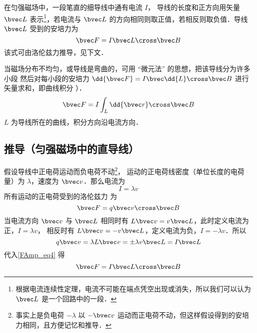 

在匀强磁场中，一段笔直的细导线中通有电流 $I$， 导线的长度和正方向用矢量 $\bvec L$ 表示\footnote{根据电流连续性定理，电流不可能在端点凭空出现或消失，所以我们可以认为 $\bvec L$ 是一个回路中的一段．}，若电流与 $\bvec L$ 的方向相同则取正值，若相反则取负值．导线 $\bvec L$ 受到的安培力为
\begin{equation}
\bvec F = I \bvec L \cross \bvec B
\end{equation}
该式可由洛伦兹力推导，见下文．

当磁场分布不均匀，或导线是弯曲的，可用 “微元法” 的思想，把该导线分为许多小段
然后对每小段的安培力 $\dd{\bvec F} = I\bvec \dd{L} \cross\bvec B$ 进行矢量求和，即曲线积分%
）．
\begin{equation}
\bvec F = I\int_L \dd{\bvec r} \cross \bvec B
\end{equation}
$L$ 为导线所在的曲线，积分方向沿电流方向．

\subsection{推导（匀强磁场中的直导线）}
假设导线中正电荷运动而负电荷不动\footnote{事实上是负电荷 $-\lambda$ 以 $-\bvec v$ 运动而正电荷不动，但这样假设得到的安培力相同，且方便记忆和推导．}， 运动的正电荷线密度（单位长度的电荷量）为 $\lambda$，速度为 $\bvec v$．那么电流为%
\begin{equation}
I = \lambda v
\end{equation}
所有运动的正电荷受到的洛伦兹力%
为
\begin{equation}\label{FAmp_eq4}
\bvec F =  q\bvec v \cross \bvec B
\end{equation}
当电流方向 $\bvec v$ 与 $\bvec L$ 相同时有 $L \bvec v = v \bvec L$，此时定义电流为正，$I = \lambda v$， 相反时有 $L \bvec v = -v\bvec L$，定义电流为负，$I = -\lambda v$．所以
\begin{equation}
q\bvec v = \lambda L \bvec v = \pm \lambda v\bvec L= I \bvec L
\end{equation}
代入\autoref{FAmp_eq4} 得
\begin{equation}
\bvec F = I \bvec L \cross \bvec B
\end{equation}


















